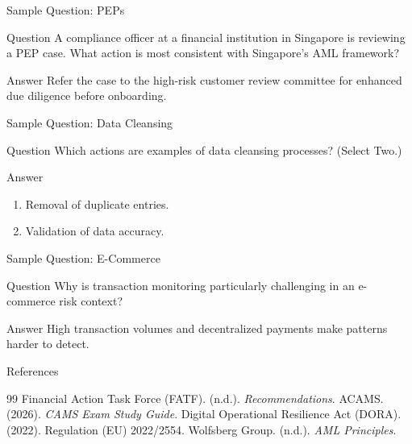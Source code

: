 \documentclass{beamer}
\begin{document}
	\begin{frame}{Sample Question: PEPs}
		\begin{block}{Question}
			A compliance officer at a financial institution in Singapore is reviewing a PEP case. What action is most consistent with Singapore’s AML framework?
		\end{block}
		\begin{block}{Answer}
			Refer the case to the high-risk customer review committee for enhanced due diligence before onboarding.
		\end{block}
	\end{frame}
	
	\begin{frame}{Sample Question: Data Cleansing}
		\begin{block}{Question}
			Which actions are examples of data cleansing processes? (Select Two.)
		\end{block}
		\begin{block}{Answer}
			\begin{enumerate}
				\item Removal of duplicate entries.
				\item Validation of data accuracy.
			\end{enumerate}
		\end{block}
	\end{frame}
	
	\begin{frame}{Sample Question: E-Commerce}
		\begin{block}{Question}
			Why is transaction monitoring particularly challenging in an e-commerce risk context?
		\end{block}
		\begin{block}{Answer}
			High transaction volumes and decentralized payments make patterns harder to detect.
		\end{block}
	\end{frame}
	
	\begin{frame}{References}
		\begin{thebibliography}{99}
			 Financial Action Task Force (FATF). (n.d.). \textit{Recommendations}.
			 ACAMS. (2026). \textit{CAMS Exam Study Guide}.
			 Digital Operational Resilience Act (DORA). (2022). Regulation (EU) 2022/2554.
			 Wolfsberg Group. (n.d.). \textit{AML Principles}.
		\end{thebibliography}
	\end{frame}
	
\end{document}
